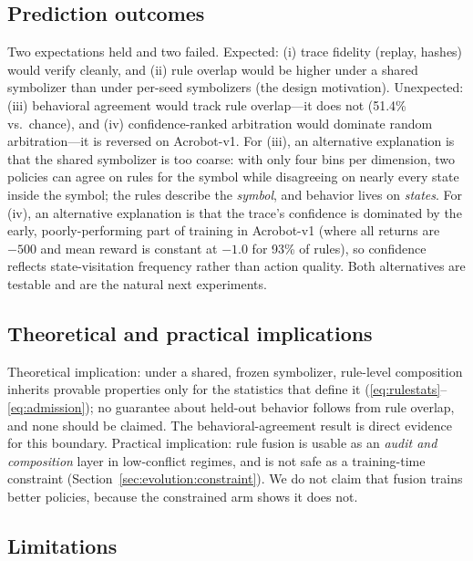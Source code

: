 \documentclass[11pt]{article}
\begin{document}
\subsection{Prediction outcomes}
\label{sec:discussion:predictions}

Two expectations held and two failed. Expected: (i) trace fidelity (replay, hashes) would verify
cleanly, and (ii) rule overlap would be higher under a shared symbolizer than under per-seed
symbolizers (the design motivation). Unexpected: (iii) behavioral agreement would track rule
overlap---it does not (51.4\% vs.\ chance), and (iv) confidence-ranked arbitration would dominate
random arbitration---it is reversed on Acrobot-v1. For (iii), an alternative explanation is that
the shared symbolizer is too coarse: with only four bins per dimension, two policies can agree on
rules for the symbol while disagreeing on nearly every state inside the symbol; the rules describe
the \emph{symbol}, and behavior lives on \emph{states}. For (iv), an alternative explanation is
that the trace's confidence is dominated by the early, poorly-performing part of training in
Acrobot-v1 (where all returns are $-500$ and mean reward is constant at $-1.0$ for 93\% of rules),
so confidence reflects state-visitation frequency rather than action quality. Both alternatives are
testable and are the natural next experiments.

\subsection{Theoretical and practical implications}
\label{sec:discussion:implications}

Theoretical implication: under a shared, frozen symbolizer, rule-level composition inherits
provable properties only for the statistics that define it (\ref{eq:rulestats}--\ref{eq:admission});
no guarantee about held-out behavior follows from rule overlap, and none should be claimed. The
behavioral-agreement result is direct evidence for this boundary. Practical implication: rule
fusion is usable as an \emph{audit and composition} layer in low-conflict regimes, and is not safe
as a training-time constraint (Section~\ref{sec:evolution:constraint}). We do not claim that fusion
trains better policies, because the constrained arm shows it does not.

\subsection{Limitations}
\label{sec:discussion:limitations}
\end{document}
